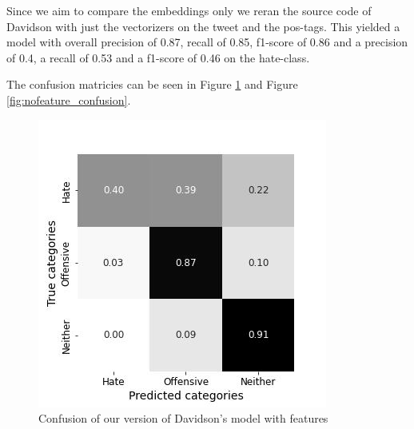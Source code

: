 \documentclass[11pt,a4paper]{article}
\begin{document}
Since we aim to compare the embeddings only we reran the source code of Davidson with just the vectorizers on the tweet and the pos-tags.
This yielded a model with overall precision of 0.87, recall of 0.85, f1-score of 0.86
and a precision of 0.4, a recall of 0.53 and a f1-score of 0.46 on the hate-class.

\begin{table}
\caption{classification report for our reproduction of Davidson's model without features} 



\label{tab:davidson_nofeat}
\end{table}

The confusion matricies can be seen in Figure \ref{fig:feature_confusion} and  Figure \ref{fig:nofeature_confusion}.

\begin{figure}[h]
  \includegraphics[width=\linewidth]{./tables-figures/feat_confusion.jpg}
  \caption{Confusion of our version of Davidson's model with features}
  \label{fig:feature_confusion}
\end{figure}
\end{document}
